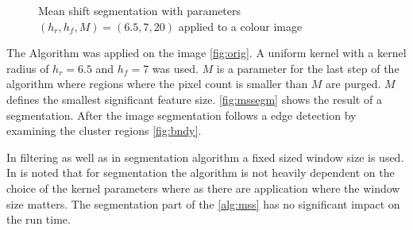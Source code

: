 \begin{figure}[ht]
  \centering {}%

  \caption{Mean shift segmentation with parameters $(h_r, h_f, M) =
    (6.5, 7, 20)$ applied to a colour image}
  \label{fig:mssegm}
\end{figure}


The Algorithm was applied on the image \autoref{fig:orig}. A uniform
kernel with a kernel radius of $h_r = 6.5$ and $h_f = 7$ was used. $M$
is a parameter for the last step of the algorithm where regions where
the pixel count is smaller than $M$ are purged. $M$ defines the
smallest significant feature size.  \autoref{fig:mssegm} shows the
result of a segmentation. After the image segmentation follows a edge
detection by examining the cluster regions \autoref{fig:bndy}.

In filtering as well as in segmentation algorithm a fixed sized window
size is used. In \citeauthor{citeulike:462300}
\citep{citeulike:462300} is noted that for segmentation the
algorithm is not heavily dependent on the choice of the kernel
parameters where as there are application where the window size
matters.  The segmentation part of the \autoref{alg:mss} has no
significant impact on the run time.


